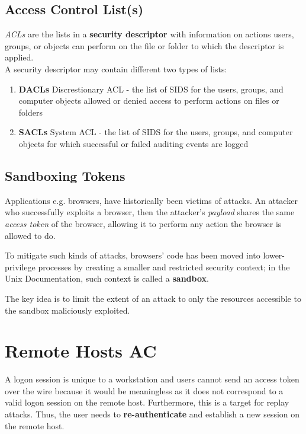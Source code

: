 \subsection{Access Control List(s)}
\textit{ACLs} are the lists in a \textbf{security descriptor} with information on actions
users, groups, or objects can perform on the file or folder to which the descriptor is applied.\\
A security descriptor may contain different two types of lists:
\begin{enumerate}
   \item \textbf{DACLs} Discrestionary ACL -
   the list of SIDS for the users, groups, and computer objects allowed or denied access to perform actions on files or folders
   \item \textbf{SACLs} System ACL -
   the list of SIDS for the users, groups, and computer objects for which successful or failed auditing events are logged
\end{enumerate}


\subsection{Sandboxing Tokens}
Applications e.g. browsers, have historically been victims of attacks.
An attacker who successfully exploits a browser,
then the attacker's \textit{payload} shares the same \textit{access token} of the browser,
allowing it to perform any action the browser is allowed to do.

To mitigate such kinds of attacks, browsers' code has been moved into lower-privilege processes by creating a smaller and restricted security context;
in the Unix Documentation, such context is called a \textbf{sandbox}.

The key idea is to limit the extent of an attack to only the resources accessible to the sandbox maliciously exploited. 

\section{Remote Hosts AC}
A logon session is unique to a workstation and users cannot send an access token over the wire because it would be meaningless as it does not correspond to a valid logon session on the remote host. Furthermore, this is a target for replay attacks.
Thus, the user needs to \textbf{re-authenticate} and establish a new session on the remote host.

